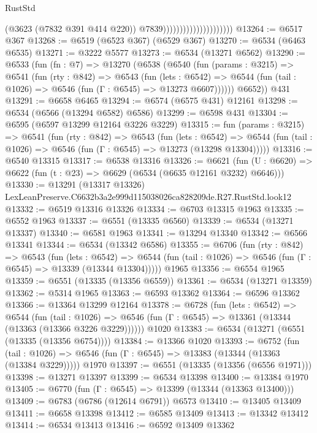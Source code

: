 \begin{lexlean}{RustStd}
\begin{coremodule}
                                              (@3623 (@7832 @391 @414 @220))
                                              @7839)))))))))))))))))))))
@13264 := @6517 @367
@13268 := @6519 (@6523 @367) (@6529 @367)
@13270 := @6534 (@6463 @6535)
@13271 := @3222 @5577
@13273 := @6534 (@13271 @6562)
@13290 := @6533
    (fun (fn : @7) =>
    @13270
      (@6538
        (@6540
          (fun (params : @3215) =>
          @6541
            (fun (rty : @842) =>
            @6543
              (fun (lets : @6542) =>
              @6544 (fun (tail : @1026) => @6546 (fun (Γ : @6545) => @13273 @6607))))))
        @6652))
    @431
@13291 := @6658 @6465
@13294 := @6574 (@6575 @431) @12161
@13298 := @6534 (@6566 (@13294 @6582) @6586)
@13299 := @6598 @431
@13304 := @6595 (@6597 @13299 @12164 @3226 @3229)
@13315 := fun (params : @3215) =>
  @6541
    (fun (rty : @842) =>
    @6543
      (fun (lets : @6542) =>
      @6544 (fun (tail : @1026) => @6546 (fun (Γ : @6545) => @13273 (@13298 @13304)))))
@13316 := @6540 @13315
@13317 := @6538 @13316
@13326 := @6621
    (fun (U : @6620) => @6622 (fun (t : @23) => @6629 (@6534 (@6635 @12161 @3232) @6646)))
@13330 := @13291
    (@13317 @13326)
    LexLeanPreserve.C6632b3a2e999d115038026ca828209de.R27.RustStd.look12
@13332 := @6519 @13316 @13326
@13334 := @6703 @13315 @1963
@13335 := @6552 @1963
@13337 := @6551 (@13335 @6560)
@13339 := @6534 (@13271 @13337)
@13340 := @6581 @1963
@13341 := @13294 @13340
@13342 := @6566 @13341
@13344 := @6534 (@13342 @6586)
@13355 := @6706
    (fun (rty : @842) =>
    @6543
      (fun (lets : @6542) =>
      @6544 (fun (tail : @1026) => @6546 (fun (Γ : @6545) => @13339 (@13344 @13304)))))
    @1965
@13356 := @6554 @1965
@13359 := @6551 (@13335 (@13356 @6559))
@13361 := @6534 (@13271 @13359)
@13362 := @5314 @1965
@13363 := @6593 @13362
@13364 := @6596 @13362
@13366 := @13364 @13299 @12164
@13378 := @6728
    (fun (lets : @6542) =>
    @6544
      (fun (tail : @1026) =>
      @6546 (fun (Γ : @6545) => @13361 (@13344 (@13363 (@13366 @3226 @3229))))))
    @1020
@13383 := @6534 (@13271 (@6551 (@13335 (@13356 @6754))))
@13384 := @13366 @1020
@13393 := @6752
    (fun (tail : @1026) => @6546 (fun (Γ : @6545) => @13383 (@13344 (@13363 (@13384 @3229)))))
    @1970
@13397 := @6551 (@13335 (@13356 (@6556 @1971)))
@13398 := @13271 @13397
@13399 := @6534 @13398
@13400 := @13384 @1970
@13405 := @6770 (fun (Γ : @6545) => @13399 (@13344 (@13363 @13400)))
@13409 := @6783 (@6786 (@12614 @6791)) @6573
@13410 := @13405 @13409
@13411 := @6658 @13398
@13412 := @6585 @13409
@13413 := @13342 @13412
@13414 := @6534 @13413
@13416 := @6592 @13409 @13362

\end{coremodule}
\end{lexlean}
